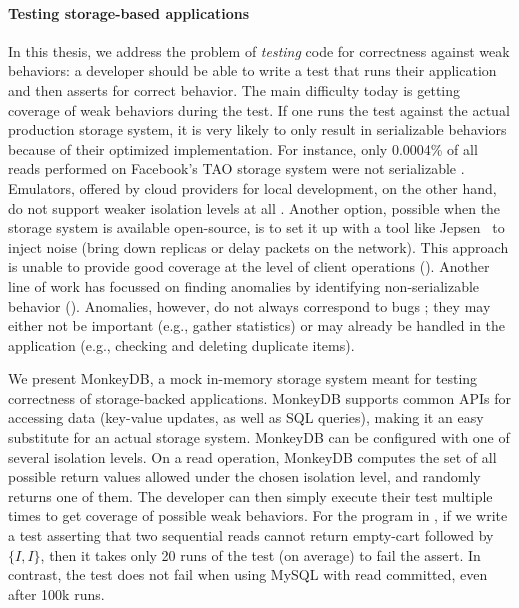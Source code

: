 \paragraph{Testing storage-based applications}
In this thesis, we address the problem of \textit{testing} code for correctness
against weak behaviors: a developer should be able to write a test that runs
their application and then asserts for correct behavior. 
The main difficulty today is getting coverage of weak behaviors during
the test. If one runs the test
against the actual production storage system, it is very likely to only result in
serializable behaviors because of their optimized implementation. For
instance, only 0.0004\% of all reads performed on Facebook's TAO storage system 
were not serializable \cite{DBLP:conf/sosp/LuVAHSTKL15}. 
Emulators, offered by cloud providers for local development, on the other hand, do not support weaker
isolation levels at all \cite{cosmosdb-local}. Another option, possible when
the storage system is available open-source, is to set it up with a 
tool like Jepsen~\cite{jepsen} to inject noise (bring down replicas or
delay packets on the network). 
This approach is unable to provide good coverage at the level of client operations
\cite{DBLP:journals/pacmpl/RahmaniNDJ19} (). Another line of work has focussed on finding
anomalies by identifying non-serializable behavior (). Anomalies, however, do not
always correspond to bugs \cite{DBLP:conf/pldi/BrutschyD0V18,DBLP:journals/pvldb/GanRRB020}; they may
either not be important (e.g., gather statistics) or may already be handled in
the application (e.g., checking and deleting duplicate items).

We present MonkeyDB, a mock in-memory storage system meant for testing
correctness of storage-backed applications. 
MonkeyDB supports 
common APIs for accessing data (key-value updates, as well as SQL queries),
making it an easy substitute for an actual storage system. MonkeyDB
can be configured with one of several isolation levels. 
On a read operation, MonkeyDB computes the set of all possible return values
allowed under the chosen isolation level, and randomly returns one of them. The
developer can then simply execute their test multiple times to get coverage of
possible weak behaviors. For the program in , if we write a test
asserting that two sequential reads cannot return empty-cart followed by $\{I,
I\}$, then it takes only 20 runs of the test (on average) to fail the
assert. In contrast, the test does not fail when using MySQL with read committed, 
even after 100k runs. 

